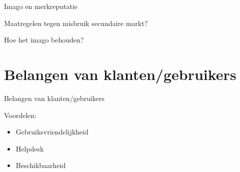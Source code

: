 \documentclass{beamer}
\begin{document}
\begin{frame}{Imago en merkreputatie}
    \begin{itemize}
        \LARGE{
            \item Maatregelen tegen misbruik secundaire markt?
            \item Hoe het imago behouden?
        }
    \end{itemize}
\end{frame}


\section[Gebruikersbelangen]{Belangen van klanten/gebruikers}
% 
% 
\begin{frame}{Belangen van klanten/gebruikers}
    \LARGE{
        Voordelen:
        \begin{itemize}
            \item Gebruiksvriendelijkheid
            \item Helpdesk
            \item Beschikbaarheid
        \end{itemize}
    }
\end{frame}
\end{document}
